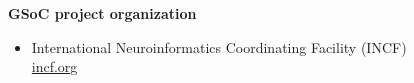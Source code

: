 \begin{frame}
\begin{columns}[t]
\begin{column}{0.59\textwidth}
      \vspace{0.3cm}
      
      \textbf{GSoC project organization}
      \begin{itemize}[leftmargin=0.6cm]
        \itemsep6pt
        \item[] International Neuroinformatics Coordinating Facility (INCF) \\%
          \href{http://incf.org/}{%
            incf.org}
       
      \end{itemize}

    \end{column}
  \end{columns}

  \vspace{0.3cm}




  

\end{frame}

